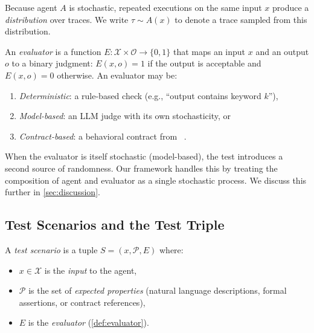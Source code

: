 Because agent $A$ is stochastic, repeated executions on the same input
$x$ produce a \emph{distribution} over traces. We write
$\tau \sim A(x)$ to denote a trace sampled from this distribution.

\begin{definition}[Evaluator]
\label{def:evaluator}
An \emph{evaluator} is a function $E: \mathcal{X} \times
\mathcal{O} \to \{0, 1\}$ that maps an input $x$ and an output $o$ to a
binary judgment: $E(x, o) = 1$ if the output is acceptable and
$E(x, o) = 0$ otherwise. An evaluator may be:
\begin{enumerate}[leftmargin=*]
  \item \emph{Deterministic}: a rule-based check (e.g., ``output
    contains keyword $k$''),
  \item \emph{Model-based}: an LLM judge with its own stochasticity, or
  \item \emph{Contract-based}: a behavioral contract from
    \agentassert{}~\citep{bhardwaj2026abc}.
\end{enumerate}
\end{definition}

\begin{remark}
When the evaluator is itself stochastic (model-based), the test
introduces a second source of randomness. Our framework handles this by
treating the composition of agent and evaluator as a single stochastic
process. We discuss this further in \cref{sec:discussion}.
\end{remark}

\subsection{Test Scenarios and the Test Triple}
\label{sec:stochastic:scenario}

\begin{definition}
\label{def:scenario}
A \emph{test scenario} is a tuple $S = (x, \mathcal{P}, E)$ where:
\begin{itemize}[leftmargin=*]
  \item $x \in \mathcal{X}$ is the \emph{input} to the agent,
  \item $\mathcal{P}$ is the set of \emph{expected properties} (natural
    language descriptions, formal assertions, or contract references),
  \item $E$ is the \emph{evaluator} (\cref{def:evaluator}).
\end{itemize}
\end{definition}

